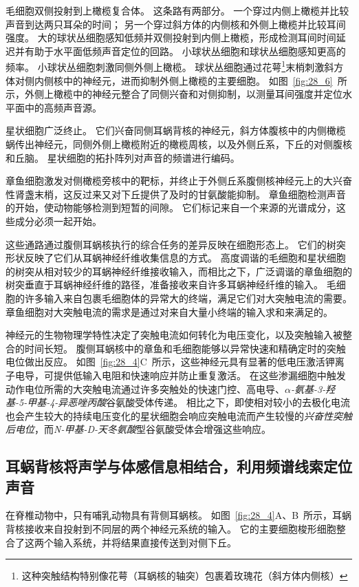 毛细胞双侧投射到上橄榄复合体。
这条路有两部分。
一个穿过内侧上橄榄并比较声音到达两只耳朵的时间； 另一个穿过斜方体的内侧核和外侧上橄榄并比较耳间强度。
大的球状丛细胞感知低频并双侧投射到内侧上橄榄，形成检测耳间时间延迟并有助于水平面低频声音定位的回路。
小球状丛细胞和球状丛细胞感知更高的频率。
小球状丛细胞刺激同侧外侧上橄榄。
球状丛细胞通过花萼\footnote{这种突触结构特别像花萼（耳蜗核的轴突）包裹着玫瑰花（斜方体内侧核）}末梢刺激斜方体对侧内侧核中的神经元，进而抑制外侧上橄榄的主要细胞。
如图~\ref{fig:28_6}~所示，外侧上橄榄中的神经元整合了同侧兴奋和对侧抑制，以测量耳间强度并定位水平面中的高频声音源。


星状细胞广泛终止。
它们兴奋同侧耳蜗背核的神经元，斜方体腹核中的内侧橄榄蜗传出神经元，同侧外侧上橄榄附近的橄榄周核，以及外侧丘系，下丘的对侧腹核和丘脑。 
星状细胞的拓扑阵列对声音的频谱进行编码。


章鱼细胞激发对侧橄榄旁核中的靶标，并终止于外侧丘系腹侧核神经元上的大兴奋性肾盏末梢，这反过来又对下丘提供了及时的甘氨酸能抑制。
章鱼细胞检测声音的开始，使动物能够检测到短暂的间隙。
它们标记来自一个来源的光谱成分，这些成分必须一起开始。


这些通路通过腹侧耳蜗核执行的综合任务的差异反映在细胞形态上。
它们的树突形状反映了它们从耳蜗神经纤维收集信息的方式。
高度调谐的毛细胞和星状细胞的树突从相对较少的耳蜗神经纤维接收输入，而相比之下，广泛调谐的章鱼细胞的树突垂直于耳蜗神经纤维的路径，准备接收来自许多耳蜗神经纤维的输入。
毛细胞的许多输入来自包裹毛细胞体的异常大的终端，满足它们对大突触电流的需要。
章鱼细胞对大突触电流的需求是通过对来自大量小终端的输入求和来满足的。


神经元的生物物理学特性决定了突触电流如何转化为电压变化，以及突触输入被整合的时间长短。
腹侧耳蜗核中的章鱼和毛细胞能够以异常快速和精确定时的突触电位做出反应。
如图~\ref{fig:28_4}C~所示，这些神经元具有显著的低电压激活钾离子电导，可提供低输入电阻和快速响应并防止重复激活。
在这些渗漏细胞中触发动作电位所需的大突触电流通过许多突触处的快速门控、高电导、\textit{$\alpha$-氨基-3-羟基-5-甲基-4-异恶唑丙酸}谷氨酸受体传递。
相比之下，即使相对较小的去极化电流也会产生较大的持续电压变化的星状细胞会响应突触电流而产生较慢的\textit{兴奋性突触后电位}，而\textit{N-甲基-D-天冬氨酸}型谷氨酸受体会增强这些响应。



\subsection{耳蜗背核将声学与体感信息相结合，利用频谱线索定位声音}

在脊椎动物中，只有哺乳动物具有背侧耳蜗核。
如图~\ref{fig:28_4}A、B~所示，耳蜗背核接收来自投射到不同层的两个神经元系统的输入。
它的主要细胞梭形细胞整合了这两个输入系统，并将结果直接传送到对侧下丘。


